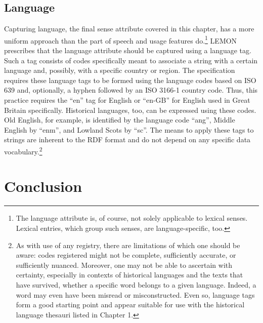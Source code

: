 \subsection{Language}
\label{sect:Stolk_thes-digital-form:lang}
Capturing language, the final sense attribute covered in this chapter, has a more uniform approach than the part of speech and usage features do.\footnote{The language attribute is, of course, not solely applicable to lexical senses. Lexical entries, which group such senses, are language-specific, too.} LEMON prescribes that the language attribute should be captured using a language tag. Such a tag consists of codes specifically meant to associate a string with a certain language and, possibly, with a specific country or region. The specification requires these language tags to be formed using the language codes based on ISO 639 and, optionally, a hyphen followed by an ISO 3166-1 country code. 
Thus, this practice requires the ``en'' tag for English or ``en-GB'' for English used in Great Britain specifically. Historical languages, too, can be expressed using these codes. Old English, for example, is identified by the language code ``ang'', Middle English by ``enm'', and Lowland Scots by ``sc''. The means to apply these tags to strings are inherent to the RDF format and do not depend on any specific data vocabulary.\footnote{As with use of any registry, there are limitations of which one should be aware: codes registered might not be complete, sufficiently accurate, or sufficiently nuanced. Moreover, one may not be able to ascertain with certainty, especially in contexts of historical languages and the texts that have survived, whether a specific word belongs to a given language. Indeed, a word may even have been misread or misconstructed. Even so, language tags form a good starting point and appear suitable for use with the historical language thesauri listed in Chapter 1.}

\section{Conclusion}
\label{sect:Stolk_thes-digital-form:conclusion}

